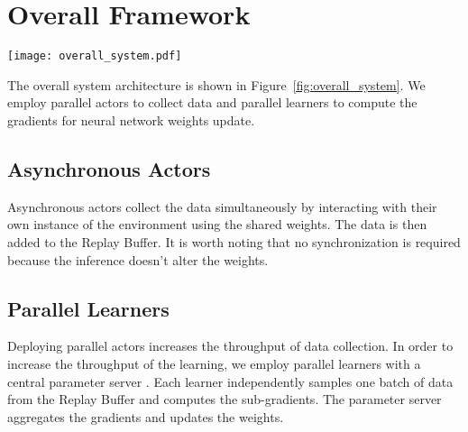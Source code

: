 \section{Overall Framework}
\begin{figure*}
    \centering
    \texttt{[image: overall\_system.pdf]}
    \caption{Overall system architecture}
    \label{fig:overall_system}
\end{figure*}

The overall system architecture is shown in Figure~\ref{fig:overall_system}. We employ parallel actors to collect data and parallel learners to compute the gradients for neural network weights update. 

\subsection{Asynchronous Actors}
Asynchronous actors collect the data simultaneously by interacting with their own instance of the environment using the shared weights. The data is then added to the Replay Buffer. It is worth noting that no synchronization is required because the inference doesn't alter the weights.

\subsection{Parallel Learners}
Deploying parallel actors increases the throughput of data collection. In order to increase the throughput of the learning, we employ parallel learners with a central parameter server \cite{parameter_server}. Each learner independently samples one batch of data from the Replay Buffer and computes the sub-gradients. The parameter server aggregates the gradients and updates the weights.

